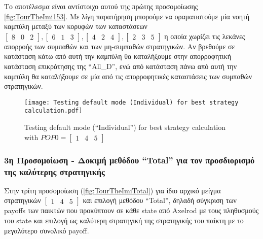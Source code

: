 Το αποτέλεσμα είναι αντίστοιχο αυτού της πρώτης προσομοίωσης \ref{fig:TourTheImi153}. Με λίγη παρατήρηση μπορούμε να οραματιστούμε μία νοητή καμπύλη μεταξύ των κορυφών των καταστάσεων $\begin{bmatrix}8&0&2\end{bmatrix}, \begin{bmatrix}6&1&3\end{bmatrix}, \begin{bmatrix}4&2&4\end{bmatrix}, \begin{bmatrix}2&3&5\end{bmatrix}$ η οποία χωρίζει τις λεκάνες απορροής των συμπαθών και των μη-συμπαθών στρατηγικών. Αν βρεθούμε σε κατάσταση κάτω από αυτή την καμπύλη θα καταλήξουμε στην απορροφητική κατάσταση επικράτησης της ``All\_D'', ενώ από κατάσταση πάνω από αυτή την καμπύλη θα καταλήξουμε σε μία από τις απορροφητικές καταστάσεις των συμπαθών στρατηγικών.
	\begin{figure}[h]
	      \centering
	      \texttt{[image: Testing default mode (Individual) for best strategy calculation.pdf]}
	      \caption{Testing default mode (``Individual'') for best strategy calculation with $POP0=\begin{bmatrix}1&4&5\end{bmatrix}$}
	      \label{fig:TourTheImiIndividual}
	\end{figure}
\subsubsection{3η Προσομοίωση - Δοκιμή μεθόδου ``Total'' για τον προσδιορισμό της καλύτερης στρατηγικής}
Στην τρίτη προσομοίωση (\ref{fig:TourTheImiTotal}) για ίδιο αρχικό μείγμα στρατηγικών $\begin{bmatrix}1&4&5\end{bmatrix}$ και επιλογή μεθόδου ``Total'', δηλαδή σύγκριση των payoffs των παικτών που προκύπτουν σε κάθε state από Axelrod με τους πληθυσμούς του state και επιλογή ως καλύτερη στρατηγική της στρατηγικής του παίκτη με το μεγαλύτερο συνολικό payoff.

